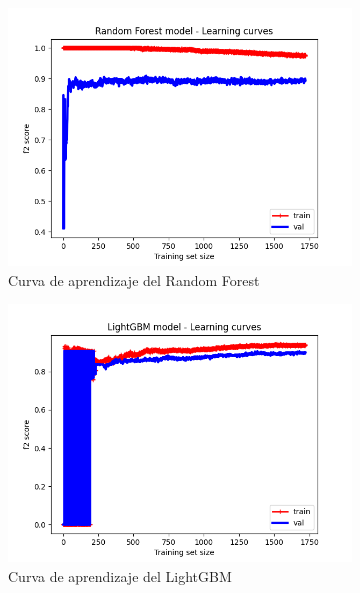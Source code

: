 \begin{figure}[!ht]
\begin{subfigure}[b]{0.3\textwidth}
        \includegraphics[width=\linewidth]{media/images/learning-curves/rf.png}
        \caption{Curva de aprendizaje del Random Forest}
        \label{sfig:lc-rf}
    \end{subfigure}
    \begin{subfigure}[b]{0.3\textwidth}
        \includegraphics[width=\linewidth]{media/images/learning-curves/lgbm.png}
        \caption{Curva de aprendizaje del LightGBM}
        \label{sfig:lc-lgbm}
    \end{subfigure}
    \begin{subfigure}[b]{0.3\textwidth}

\end{subfigure}
\end{figure}
